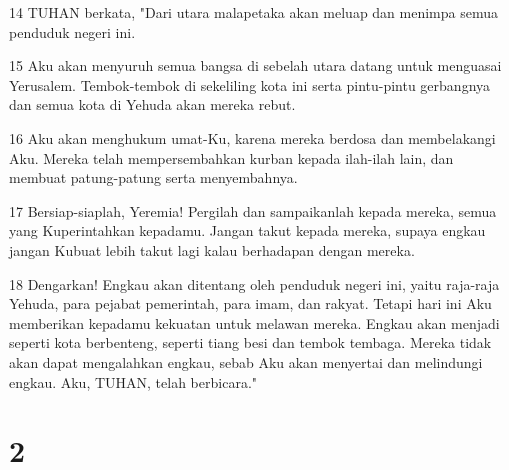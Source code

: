 \par 14 TUHAN berkata, "Dari utara malapetaka akan meluap dan menimpa semua penduduk negeri ini.
\par 15 Aku akan menyuruh semua bangsa di sebelah utara datang untuk menguasai Yerusalem. Tembok-tembok di sekeliling kota ini serta pintu-pintu gerbangnya dan semua kota di Yehuda akan mereka rebut.
\par 16 Aku akan menghukum umat-Ku, karena mereka berdosa dan membelakangi Aku. Mereka telah mempersembahkan kurban kepada ilah-ilah lain, dan membuat patung-patung serta menyembahnya.
\par 17 Bersiap-siaplah, Yeremia! Pergilah dan sampaikanlah kepada mereka, semua yang Kuperintahkan kepadamu. Jangan takut kepada mereka, supaya engkau jangan Kubuat lebih takut lagi kalau berhadapan dengan mereka.
\par 18 Dengarkan! Engkau akan ditentang oleh penduduk negeri ini, yaitu raja-raja Yehuda, para pejabat pemerintah, para imam, dan rakyat. Tetapi hari ini Aku memberikan kepadamu kekuatan untuk melawan mereka. Engkau akan menjadi seperti kota berbenteng, seperti tiang besi dan tembok tembaga. Mereka tidak akan dapat mengalahkan engkau, sebab Aku akan menyertai dan melindungi engkau. Aku, TUHAN, telah berbicara."

\chapter{2}

